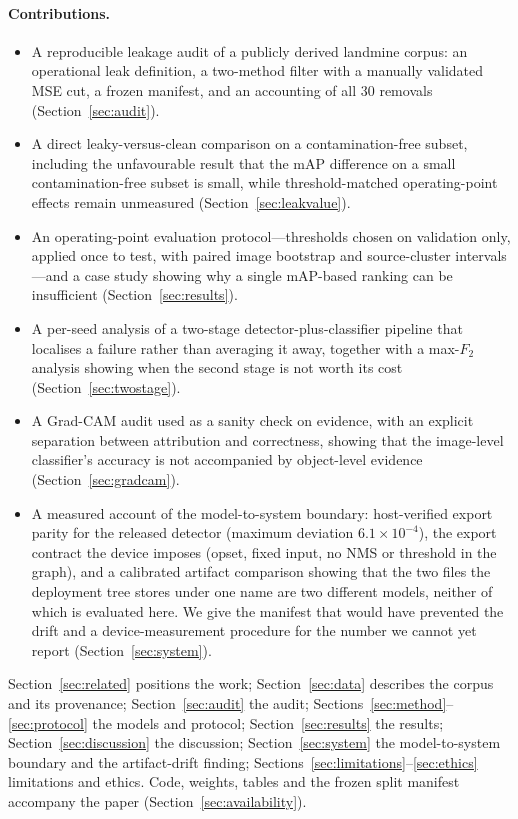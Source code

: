 \paragraph{Contributions.}
\begin{itemize}[leftmargin=1.2em,itemsep=2pt]
\item A reproducible leakage audit of a publicly derived landmine corpus: an
operational leak definition, a two-method filter with a manually validated MSE
cut, a frozen manifest, and an accounting of all $30$ removals
(Section~\ref{sec:audit}).
\item A direct leaky-versus-clean comparison on a contamination-free subset,
including the unfavourable result that the mAP difference on a small
contamination-free subset is small, while threshold-matched operating-point
effects remain unmeasured
(Section~\ref{sec:leakvalue}).
\item An operating-point evaluation protocol---thresholds chosen on validation
only, applied once to test, with paired image bootstrap and source-cluster
intervals---and a case study showing why a single mAP-based ranking can be
insufficient
(Section~\ref{sec:results}).
\item A per-seed analysis of a two-stage detector-plus-classifier pipeline that
localises a failure rather than averaging it away, together with a max-$F_2$
analysis showing when the second stage is not worth its cost
(Section~\ref{sec:twostage}).
\item A Grad-CAM audit used as a sanity check on evidence, with an explicit
separation between attribution and correctness, showing that the image-level
classifier's accuracy is not accompanied by object-level evidence
(Section~\ref{sec:gradcam}).
\item A measured account of the model-to-system boundary: host-verified export
parity for the released detector (maximum deviation $6.1\times10^{-4}$), the
export contract the device imposes (opset, fixed input, no NMS or threshold in
the graph), and a calibrated artifact comparison showing that the two files the
deployment tree stores under one name are two different models, neither of which
is evaluated here. We give the manifest that would have prevented the drift and a
device-measurement procedure for the number we cannot yet report
(Section~\ref{sec:system}).
\end{itemize}

Section~\ref{sec:related} positions the work; Section~\ref{sec:data} describes the
corpus and its provenance; Section~\ref{sec:audit} the audit;
Sections~\ref{sec:method}--\ref{sec:protocol} the models and protocol;
Section~\ref{sec:results} the results; Section~\ref{sec:discussion} the
discussion; Section~\ref{sec:system} the model-to-system boundary and the
artifact-drift finding; Sections~\ref{sec:limitations}--\ref{sec:ethics}
limitations and ethics. Code, weights, tables and the frozen split manifest
accompany the paper (Section~\ref{sec:availability}).
